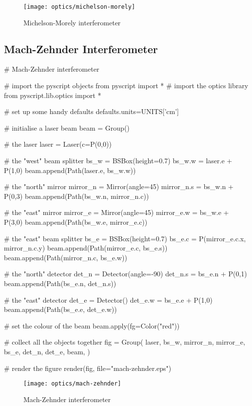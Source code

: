 \begin{figure}[ht]
\centerline{\texttt{[image: optics/michelson-morely]}}
\caption{Michelson-Morely interferometer}
\label{fig:michelson-morely}
\end{figure}

\subsection{Mach-Zehnder Interferometer}

\begin{python}
# Mach-Zehnder interferometer

# import the pyscript objects
from pyscript import *
# import the optics library
from pyscript.lib.optics import *

# set up some handy defaults
defaults.units=UNITS['cm']

# initialise a laser beam
beam = Group()

# the laser
laser = Laser(c=P(0,0))

# the "west" beam splitter
bs_w = BSBox(height=0.7)
bs_w.w = laser.e + P(1,0)
beam.append(Path(laser.e, bs_w.w))

# the "north" mirror
mirror_n = Mirror(angle=45)
mirror_n.s = bs_w.n + P(0,3)
beam.append(Path(bs_w.n, mirror_n.c))

# the "east" mirror
mirror_e = Mirror(angle=45)
mirror_e.w = bs_w.e + P(3,0)
beam.append(Path(bs_w.e, mirror_e.c))

# the "east" beam splitter
bs_e = BSBox(height=0.7)
bs_e.c = P(mirror_e.c.x, mirror_n.c.y)
beam.append(Path(mirror_e.c, bs_e.s))
beam.append(Path(mirror_n.c, bs_e.w))

# the "north" detector
det_n = Detector(angle=-90)
det_n.s = bs_e.n + P(0,1)
beam.append(Path(bs_e.n, det_n.s))

# the "east" detector
det_e = Detector()
det_e.w = bs_e.e + P(1,0)
beam.append(Path(bs_e.e, det_e.w))

# set the colour of the beam
beam.apply(fg=Color("red"))

# collect all the objects together
fig = Group(
        laser,
        bs_w,
        mirror_n, mirror_e,
        bs_e,
        det_n, det_e,
        beam,
        )

# render the figure
render(fig,
        file="mach-zehnder.eps")
\end{python}

\begin{figure}[ht]
\centerline{\texttt{[image: optics/mach-zehnder]}}
\caption{Mach-Zehnder interferometer}
\label{fig:mach-zehnder}
\end{figure}

